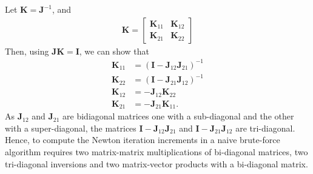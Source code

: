 \documentclass[11pt]{article}
\newcommand{\mvec}[1]{\mathbf{#1}}
\begin{document}
Let $\mvec{K} = \mvec{J}^{-1}$, and
\begin{align}
  \mvec{K} = 
  \left[
    \begin{array}{cc}
      \mvec{K}_{11} & \mvec{K}_{12} \\
      \mvec{K}_{21} & \mvec{K}_{22}
    \end{array}
  \right]
\end{align}
Then, using $\mvec{J}\mvec{K} = \mvec{I}$, we can show that
\begin{align}
  \mvec{K}_{11} &= (\mvec{I} - \mvec{J}_{12}\mvec{J}_{21})^{-1} \\
  \mvec{K}_{22} &= (\mvec{I} - \mvec{J}_{21}\mvec{J}_{12})^{-1} \\
  \mvec{K}_{12} &= -\mvec{J}_{12} \mvec{K}_{22} \\
  \mvec{K}_{21} &= -\mvec{J}_{21} \mvec{K}_{11}.
\end{align}
As $\mvec{J}_{12}$ and $\mvec{J}_{21}$ are bidiagonal matrices one
with a sub-diagonal and the other with a super-diagonal, the matrices
$\mvec{I} - \mvec{J}_{12}\mvec{J}_{21}$ and $\mvec{I} -
\mvec{J}_{21}\mvec{J}_{12}$ are tri-diagonal. Hence, to compute the
Newton iteration increments in a naive brute-force algorithm requires
two matrix-matrix multiplications of bi-diagonal matrices, two
tri-diagonal inversions and two matrix-vector products with a
bi-diagonal matrix.
\end{document}
